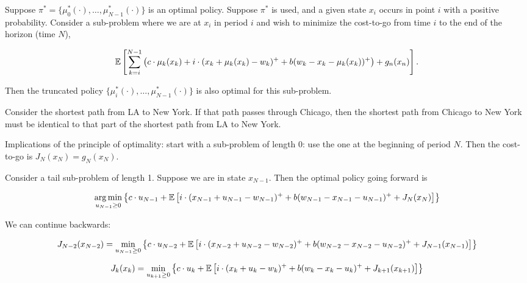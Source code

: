 \begin{definition}

Suppose \(\pi^* = \{\mu_0^*(\cdot), \ldots, \mu_{N-1}^*(\cdot)\}\) is an optimal policy. Suppose \(\pi^*\) is used, and a given state \(x_i\) occurs in point \(i\) with a positive probability. Consider a sub-problem where we are at \(x_i\) in period \(i\) and wish to minimize the cost-to-go from time \(i\) to the end of the horizon (time \(N\)),

\[
 \mathbb{E} \left[ \sum_{k=i}^{N-1} \left( c \cdot \mu_k(x_k) +  i \cdot (x_k +  \mu_k(x_k) - w_k)^+ + b(w_k - x_k -  \mu_k(x_k))^+ \right) + g_n(x_n) \right].
\]

Then the truncated policy \(\{\mu_i^*(\cdot), \ldots, \mu_{N-1}^*(\cdot)\}\) is also optimal for this sub-problem.

\end{definition}

\begin{example}[Analogy]

Consider the shortest path from LA to New York. If that path passes through Chicago, then the shortest path from Chicago to New York must be identical to that part of the shortest path from LA to New York.

\end{example}

Implications of the principle of optimality: start with a sub-problem of length 0: use the one at the beginning of period \(N\). Then the cost-to-go is \(J_N(x_N) = g_N(x_N)\).

Consider a tail sub-problem of length 1. Suppose we are in state \(x_{N-1}\). Then the optimal policy going forward is

\[
\underset{u_{N-1} \geq 0}{\arg \min} \left\{ c \cdot u_{N-1} + \mathbb{E} \left[   i \cdot (x_{N-1} +  u_{N-1}- w_{N-1} )^+ + b(w_{N-1} - x_{N-1} -  u_{N-1} )^+  + J_N(x_N) \right] \right\}
\]

We can continue backwards:

\[
J_{N-2}(x_{N-2}) = \underset{u_{N-1} \geq 0}{\min} \left\{ c \cdot u_{N-2} + \mathbb{E} \left[   i \cdot (x_{N-2} +  u_{N-2}- w_{N-2} )^+ + b(w_{N-2} - x_{N-2} -  u_{N-2} )^+  + J_{N-1}(x_{N-1}) \right] \right\}
\]

\[
J_{k}(x_{k}) = \underset{u_{k+1} \geq 0}{\min} \left\{ c \cdot u_{k} + \mathbb{E} \left[   i \cdot (x_{k} +  u_{k}- w_{k} )^+ + b(w_{k} - x_{k} -  u_{k} )^+  + J_{k+1}(x_{k+1}) \right] \right\}
\]

